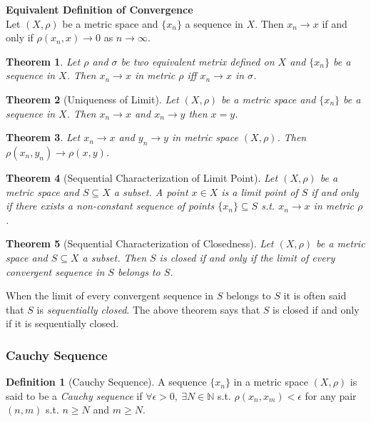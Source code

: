 \documentclass{article}
\newtheorem{theorem}{Theorem}[section]
\numberwithin{theorem}{subsection}
\numberwithin{theorem}{subsubsection}
\numberwithin{lemma}{subsection}
\numberwithin{lemma}{subsubsection}
\theoremstyle{definition}
\newtheorem{definition}{Definition}[section]
\numberwithin{definition}{subsection}
\numberwithin{definition}{subsubsection}
\begin{document}
\noindent \textbf{Equivalent Definition of Convergence} \\
\indent Let $(X,\rho)$ be a metric space and $\{x_{n}\}$ a sequence in $X$. Then $x_{n} \rightarrow x$ if and only if $\rho(x_{n},x) \rightarrow 0$ as $n\rightarrow \infty$. 

\begin{theorem}
    Let $\rho$ and $\sigma$ be two equivalent metrix defined on $X$ and $\{x_{n}\}$ be a sequence in $X$. Then $x_{n} \rightarrow x$ in metric $\rho$ iff $x_{n} \rightarrow x$ in $\sigma$.
\end{theorem}

\begin{theorem}[Uniqueness of Limit]
    Let $(X,\rho)$ be a metric space and $\{x_{n}\}$ be a sequence in $X$. Then $x_{n} \rightarrow x$ and $x_{n} \rightarrow y$ then $x = y$.
\end{theorem}

\begin{theorem}
    Let $x_{n} \rightarrow x$ and $y_{n} \rightarrow y$ in metric space $(X,\rho)$. Then $\rho(x_{n},y_{n}) \rightarrow \rho(x,y)$.
\end{theorem}

\begin{theorem}[Sequential Characterization of Limit Point]
    Let $(X, \rho)$ be a metric space and $S \subseteq X$ a subset. A point $x \in X$ is a limit point of $S$ if and only if there exists a non-constant sequence of points $\{x_{n}\} \subseteq S$ s.t. $x_{n} \rightarrow x$ in metric $\rho$.
\end{theorem}

\begin{theorem}[Sequential Characterization of Closedness]
    Let $(X,\rho)$ be a metric space and $S \subseteq X$ a subset. Then $S$ is closed if and only if the limit of every convergent sequence in $S$ belongs to $S$.
\end{theorem}

When the limit of every convergent sequence in $S$ belongs to $S$ it is often said that $S$ is \textit{sequentially closed}. The above theorem says that $S$ is closed if and only if it is sequentially closed.
\\


\subsubsection{Cauchy Sequence} 

\begin{definition}[Cauchy Sequence]
    A sequence $\{x_{n}\}$ in a metric space $(X,\rho)$ is said to be a \textit{Cauchy sequence} if $\forall \epsilon > 0,\ \exists N \in \mathbb{N}$ s.t. $\rho(x_{n},x_{m}) < \epsilon$ for any pair $(n,m)$ s.t. $n \geq N$ and $m \geq N$.
\end{definition}
\end{document}
